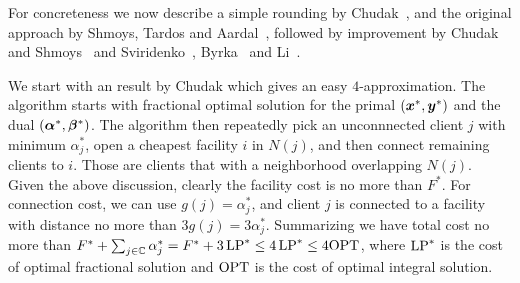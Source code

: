 \documentclass[oneside,final]{ucr}
\begin{document}
For concreteness we now describe a simple rounding by
Chudak~\cite{Chudak98}, and the original approach by Shmoys,
Tardos and Aardal~\cite{ShmoysTA97}, followed by improvement
by Chudak and Shmoys~\cite{ChudakS04} and
Sviridenko~\cite{Svi02}, Byrka~\cite{Byrka07} and
Li~\cite{Li11}.

We start with an result by Chudak which gives an easy
$4$-approximation. The algorithm starts with fractional
optimal solution for the primal $(\boldsymbol{x}^\ast,\boldsymbol{y}^\ast)$ and
the dual $(\boldsymbol{\alpha}^\ast, \boldsymbol{\beta}^\ast)$. The algorithm then
repeatedly pick an unconnnected client $j$ with minimum
$\alpha_j^\ast$, open a cheapest facility $i$ in $N(j)$, and
then connect remaining clients to $i$. Those are clients
that with a neighborhood overlapping $N(j)$. Given the above
discussion, clearly the facility cost is no more than
$F^\ast$. For connection cost, we can use $g(j) =
\alpha_j^\ast$, and client $j$ is connected to a facility
with distance no more than $3 g(j) = 3
\alpha_j^\ast$. Summarizing we have total cost no more than
$F^\ast + \sum_{j\in\mathbb{C}} \alpha_j^\ast = F^\ast +
3\,\mbox{\rm LP}^\ast \leq 4\,\mbox{\rm LP}^\ast \leq 4\mbox{\rm OPT}$, where $\mbox{\rm LP}^\ast$ is
the cost of optimal fractional solution and $\mbox{\rm OPT}$ is the
cost of optimal integral solution.
\end{document}
